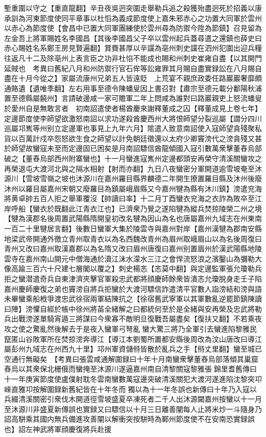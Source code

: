 塹重圍以守之【重直龍翻】辛丑夜吳迥突圍走舉勒兵追之殺獲殆盡迥死於招義以康承訓為河東節度使同平章事以杜慆為義成節度使上嘉朱邪赤心之功置大同軍於雲州以赤心為節度使【會昌中已置大同軍團練使於雲州尋為防禦今陞為節鎮】召見留為左金吾上將軍賜姓名李國昌【其後李國昌父子卒以雲州起兵蓋尋遣之還鎮也薛史曰赤心賜姓名系鄭王房見賢遍翻】賞賚甚厚以辛讜為亳州刺史讜在泗州犯圍出迎兵糧往返凡十二及除亳州上表言臣之功非杜惂不能成也賜和州刺史崔雍自盡【以其開門延賊也　考異曰舊紀八月和州防禦行官石侔等訟雍罪其月賜自盡實録訟在八月賜自盡在十月今從之】家屬流康州兄弟五人皆遠貶　上荒宴不親庶政委任路巖巖奢靡頗通賂遺【遺唯季翻】左右用事至德令陳蟠叟因上書召對【肅宗至德元載分鄱陽秋浦置至德縣屬饒州】言請破邊咸一家可贍軍二年上問咸為誰對曰路巖親吏上怒流蟠叟於愛州自是無敢言者　初南詔遣使者楊酋慶來謝釋董成之囚【釋董成見上卷七年】定邊節度使李師望欲激怒南詔以求功遂殺酋慶西州大將恨師望分裂巡屬【謂分四川巡屬邛嶲等州别立定邊軍也事見上九年六月】隂遣人致意南詔使入寇師望貪殘聚私貨以百萬計戍卒怨怒欲生食之師望以計免朝廷徵還以太府少卿竇滂代之滂貪殘又甚於師望故蠻寇未至而定邊固已困矣是月南詔驃信酋龍傾國入寇引數萬衆擊董舂烏部破之【董舂烏部西州附寨蠻也】十一月蠻進寇嶲州定邊都頭安再榮守清溪關蠻攻之再榮退屯大渡河北與之隔水相射【射而亦翻】九日八夜蠻密分軍開道逾雪坡奄至沐源川【雪坡雪嶺之坡也沐源川在嘉州羅目縣界麟德二年開生撩置羅目縣及沐州後廢沐州以羅目屬嘉州宋朝又廢羅目為鎮屬峨眉縣又今嘉州犍為縣有沐川鎮】滂遣兖海將黄卓帥五百人拒之舉軍覆沒【帥讀曰率】十二月丁酉蠻衣兖海之衣詐為敗卒至江岸呼船【蠻衣於既翻此江青衣江也】已濟衆乃覺之遂陷犍為縱兵焚掠陵榮二州之境【犍為漢郡名後周置武陽縣隋開皇初改名犍為因山為名也唐屬嘉州九域志在州東南一百二十里犍居言翻】後數日蠻軍大集於陵雲寺與嘉州對岸【嘉州漢犍為郡南安縣地梁武帝開通外徼立青州取青衣以為名西魏改青州為眉州取峨眉山以為名後周復曰青州又改曰嘉州取漢嘉郡以為名隋又改曰眉州唐復曰嘉州别置眉州於漢武陽縣地陵雲寺在嘉州南山開元中僧海通於瀆江沫水濛水三江之會悍流怒浪之濱鑿山為彌勒大像高踰三百六十尺建七層閣以覆之】刺史楊忞【忞莫中翻】與定邊監軍張允瓊勒兵拒之蠻潜遣奇兵自東津濟夾擊官軍殺忠武都將顔慶師餘衆皆潰忞允瓊脱身走壬子陷嘉州慶師慶復之弟也竇滂自將兵拒蠻於大渡河驃信詐遣清平官數人詣滂結和滂與語未畢蠻乘船栰爭渡忠武徐宿兩軍結陳抗之【徐宿舊武寧軍以其軍數亂逆罷節鎮陳讀曰陣】滂懼自經於帳中徐州將苖全緒解之曰都統何至於是全緒與安再榮及忠武將勒兵出戰滂遂單騎宵遁三將謀曰今衆寡不敵明旦復戰吾屬盡矣【復扶又翻】不若乘夜攻之使之驚亂然後解去于是夜入蠻軍弓弩亂蠻大驚三將乃全軍引去蠻進陷黎雅民竄匿山谷敗軍所在焚掠滂奔導江【導江本劉蜀所置都安縣後周改為汶山唐改曰導江屬彭州九域志在州西九十里】邛州軍資儲偫皆散於亂兵之手【偫丈里翻】蠻至城已空通行無礙矣　【考異曰張雲咸通解圍録曰十年十月南蠻衆擊董舂烏部落傾其巢窟舂烏以其衆保北栅俄而蠻掩至沐源川遂逼嘉州南自清黎關寇黎雅張錦里耆舊傳曰十一年庚寅節度使盧僕射耽冬雲南蠻數萬寇邊突破清溪關犯大渡河遂進陷沈黎突卭崍直雅卭按解圍録新舊紀皆在十年冬而獨以為十一年冬誤也新傳曰十年乃入寇以兵綴清溪關密引衆伐木開道徑雪坡盛夏卒凍死者二千人出沐源闚嘉州按蠻以十一月至沐源川非盛夏新傳誤也實録又曰驃信以十月三日離善闡每人止將米炒一斗隨身乃詔高駢乘其國内無兵備進攻善闡以解衝突按駢時為鄆州節度使不在安南恐實録誤也】詔左神武將軍顔慶復將兵赴援

